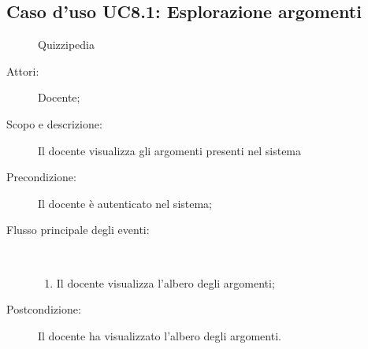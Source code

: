 \subsection{Caso d'uso UC8.1: Esplorazione argomenti}
	\begin{figure}[H]
		\centering
		\begin{resizedtikzpicture}{\textwidth}
		\begin{umlsystem}[x=0, fill=lightgray!20]{Quizzipedia}
		\end{umlsystem}
		\end{resizedtikzpicture}
		\caption{}
	\end{figure}
\begin{description}
\item[Attori:] Docente;
\item[Scopo e descrizione:] Il docente visualizza gli argomenti presenti nel sistema
      \item[Precondizione:] Il docente è autenticato nel sistema;

        \item[Flusso principale degli eventi:] \ 
 \begin{enumerate}
          \item Il docente visualizza l'albero degli argomenti;

      \end{enumerate}
    \item[Postcondizione:] Il docente ha visualizzato l'albero degli argomenti.
  \end{description}
\hypertarget{UC8.2}{}
